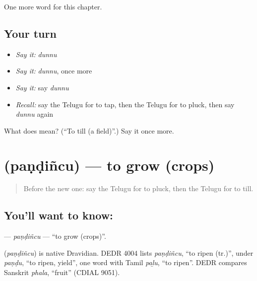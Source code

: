 \begin{grammarlens}[title={What you've built}]
One more word for this chapter.
\end{grammarlens}

\subsection*{Your turn}
\begin{itemize}
\raggedright
  \item \emph{Say it:} \emph{dunnu}
  \item \emph{Say it:} \emph{dunnu}, once more
  \item \emph{Say it:} say \emph{dunnu}
  \item \emph{Recall:} say the Telugu for to tap, then the Telugu for to pluck, then say \emph{dunnu} again
\end{itemize}

\begin{tcolorbox}[breakable,colback=teal!4,colframe=teal!35!black,title={Before you move on}]
What does  mean? (\textquotedblleft{}To till (a field)\textquotedblright{}.) Say it once more.
\end{tcolorbox}
\section[\texorpdfstring{\te{పండించు} (paṇḍiñcu)}{పండించు (paṇḍiñcu)}]{ (paṇḍiñcu) — to grow (crops)}

\label{lesson:TE-C207-pandincu}



\begin{quote}
Before the new one: say the Telugu for to pluck, then the Telugu for to till.
\end{quote}

\subsection*{You'll want to know: }
\textbf{} — \emph{paṇḍiñcu} — \textquotedblleft{}to grow (crops)\textquotedblright{}.

\begin{cousinweb}
\textbf{} (\emph{paṇḍiñcu}) is native Dravidian. DEDR 4004 lists \emph{paṇḍiñcu}, \textquotedblleft{}to ripen (tr.)\textquotedblright{}, under \emph{paṇḍu}, \textquotedblleft{}to ripen, yield\textquotedblright{}, one word with Tamil \emph{paḻu}, \textquotedblleft{}to ripen\textquotedblright{}. DEDR compares Sanskrit \emph{phala}, \textquotedblleft{}fruit\textquotedblright{} (CDIAL 9051).
\end{cousinweb}

